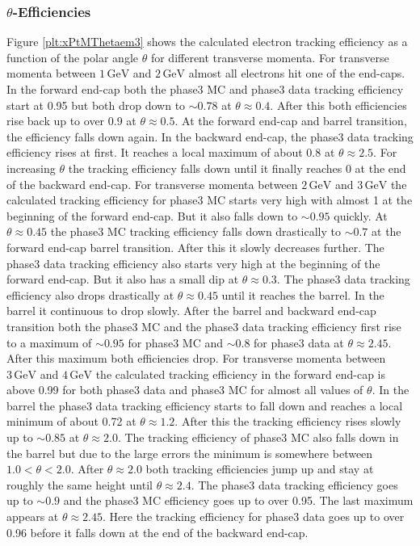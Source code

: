 \documentclass[a4paper,11pt,twosided,final,german,openbib,pdftex,listof=totoc,bibliography=totoc]{scrbook}
\begin{document}
\newpage

\subsubsection{$\theta$-Efficiencies}

Figure \ref{plt:xPtMThetaem3} shows the calculated electron tracking efficiency as a function of the polar angle $\theta$ for different transverse momenta.
For transverse momenta between $1\,\textrm{GeV}$ and $2\,\textrm{GeV}$ almost all electrons hit one of the end-caps. In the forward end-cap both the phase3 MC and phase3 data tracking efficiency start at 0.95 but both drop down to $\sim 0.78$ at $\theta \approx 0.4$. After this both efficiencies rise back up to over 0.9 at $\theta \approx 0.5$. At the forward end-cap and barrel transition, the efficiency falls down again. In the backward end-cap, the phase3 data tracking efficiency rises at first. It reaches a local maximum of about 0.8 at $\theta \approx 2.5$. For increasing $\theta$ the tracking efficiency falls down until it finally reaches 0 at the end of the backward end-cap.
For transverse momenta between $2\,\textrm{GeV}$ and $3\,\textrm{GeV}$ the calculated tracking efficiency for phase3 MC starts very high with almost 1 at the beginning of the forward end-cap. But it also falls down to $\sim 0.95$ quickly. At $\theta \approx 0.45$ the phase3 MC tracking efficiency falls down drastically to $\sim 0.7$ at the forward end-cap barrel transition. After this it slowly decreases further. The phase3 data tracking efficiency also starts very high at the beginning of the forward end-cap. But it also has a small dip at $\theta \approx 0.3$. The phase3 data tracking efficiency also drops drastically at $\theta \approx 0.45$ until it reaches the barrel. In the barrel it continuous to drop slowly. After the barrel and backward end-cap transition both the phase3 MC and the phase3 data tracking efficiency first rise to a maximum of $\sim 0.95$ for phase3 MC and $\sim 0.8$ for phase3 data at $\theta \approx 2.45$. After this maximum both efficiencies drop.
For transverse momenta between $3\,\textrm{GeV}$ and $4\,\textrm{GeV}$ the calculated tracking efficiency in the forward end-cap is above 0.99 for both phase3 data and phase3 MC for almost all values of $\theta$. In the barrel the phase3 data tracking efficiency starts to fall down and reaches a local minimum of about 0.72 at $\theta \approx 1.2$. After this the tracking efficiency rises slowly up to $\sim 0.85$ at $\theta \approx 2.0$. The tracking efficiency of phase3 MC also falls down in the barrel but due to the large errors the minimum is somewhere between $1.0 < \theta < 2.0$. After $\theta \approx 2.0$ both tracking efficiencies jump up and stay at roughly the same height until $\theta \approx 2.4$. The phase3 data tracking efficiency goes up to $\sim 0.9$ and the phase3 MC efficiency goes up to over 0.95. The last maximum appears at $\theta \approx 2.45$. Here the tracking efficiency for phase3 data goes up to over 0.96 before it  falls down at the end of the backward end-cap.
\end{document}
